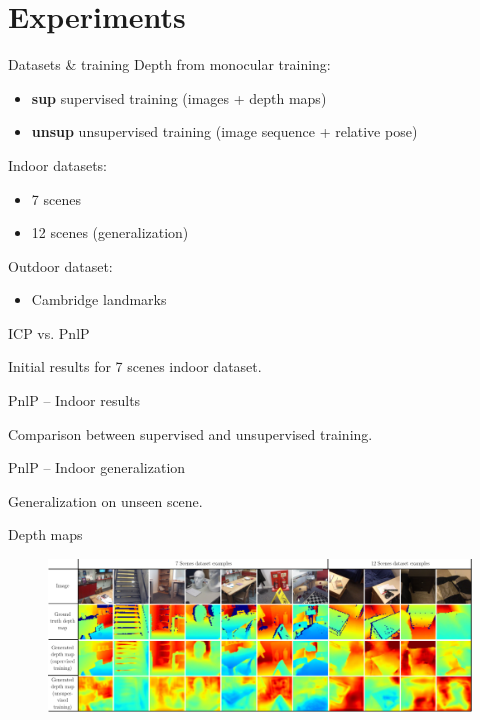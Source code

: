 \section{Experiments}

\label{sec:results}

\begin{frame}{Datasets \& training}
	Depth from monocular training:
	\begin{itemize}
		\item \textbf{sup} supervised training (images + depth maps)
		\item \textbf{unsup} unsupervised training (image sequence + relative pose)
	\end{itemize}
	{
		Indoor datasets:
		\begin{itemize}
			\item 7 scenes
			\item 12 scenes (generalization)
		\end{itemize}
		Outdoor dataset:
		\begin{itemize}
			\item Cambridge landmarks
		\end{itemize}
	}

\end{frame}

\begin{frame}{ICP vs. PnlP}
	\centering
	
	
	\vfill
	
	Initial results for 7 scenes indoor dataset.
\end{frame}

\begin{frame}{PnlP -- Indoor results}
	\centering
	
	
	\vfill
	
	Comparison between supervised and unsupervised training.
\end{frame}

\begin{frame}{PnlP -- Indoor generalization}
	\centering
	
	
	\vfill
	
	Generalization on unseen scene.
\end{frame}

\begin{frame}{Depth maps}
	\begin{figure}
		\includegraphics[width=\linewidth]{images/results/depth_map/fig1/fig1-noborder}
	\end{figure}
\end{frame}

